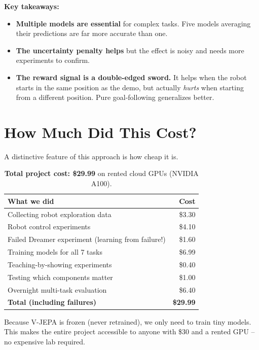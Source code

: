 \documentclass{article}
\begin{document}
\textbf{Key takeaways:}
\begin{itemize}[nosep]
    \item \textbf{Multiple models are essential} for complex tasks. Five models averaging their predictions are far more accurate than one.
    \item \textbf{The uncertainty penalty helps} but the effect is noisy and needs more experiments to confirm.
    \item \textbf{The reward signal is a double-edged sword.} It helps when the robot starts in the same position as the demo, but actually \emph{hurts} when starting from a different position. Pure goal-following generalizes better.
\end{itemize}

\section{How Much Did This Cost?}

A distinctive feature of this approach is how cheap it is.

\begin{table}[h]
\centering
\caption{\textbf{Total project cost: \$29.99} on rented cloud GPUs (NVIDIA A100).}
\label{tab:cost}
\begin{tabular}{lr}
\toprule
\textbf{What we did} & \textbf{Cost} \\
\midrule
Collecting robot exploration data & \$3.30 \\
Robot control experiments & \$4.10 \\
Failed Dreamer experiment (learning from failure!) & \$1.60 \\
Training models for all 7 tasks & \$6.99 \\
Teaching-by-showing experiments & \$0.40 \\
Testing which components matter & \$1.00 \\
Overnight multi-task evaluation & \$6.40 \\
\midrule
\textbf{Total (including failures)} & \textbf{\$29.99} \\
\bottomrule
\end{tabular}
\end{table}

Because V-JEPA is frozen (never retrained), we only need to train tiny models. This makes the entire project accessible to anyone with \$30 and a rented GPU -- no expensive lab required.
\end{document}
